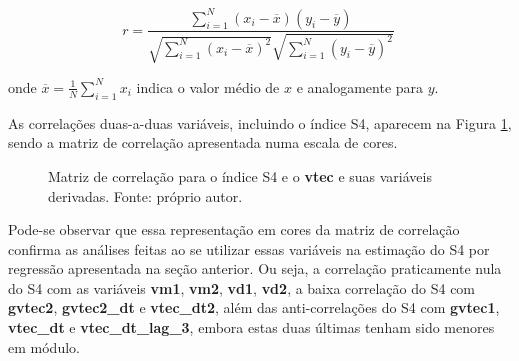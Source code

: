 \begin{equation}
 r = \frac{\sum_{i=1}^{N}(x_i-\overline{x})(y_i-\overline{y})}{\sqrt{\sum_{i=1}^{N}(x_i-\overline{x})^2}\sqrt{\sum_{i=1}^{N}(y_i-\overline{y})^2}}~
 \end{equation}
 
onde $\overline{x}=\frac{1}{N}\sum_{i=1}^Nx_i$ indica o valor médio de $x$ e analogamente para $y$.

As correlações duas-a-duas variáveis, incluindo o índice S4, aparecem na Figura \ref{fig:matriz_corr}, sendo a matriz de correlação apresentada numa escala de cores.

\begin{figure}[hhh]
\centering
{}
\caption{Matriz de correlação para o índice S4 e o {\bf vtec} e suas variáveis derivadas. Fonte: próprio autor.}
\label{fig:matriz_corr}
\end{figure}

Pode-se observar que essa representação em cores da matriz de correlação confirma as análises feitas ao se utilizar essas variáveis na estimação do S4 por regressão apresentada na seção anterior. Ou seja, a correlação praticamente nula do S4 com as variáveis {\bf vm1}, {\bf vm2}, {\bf vd1}, {\bf vd2}, a baixa correlação do S4 com {\bf gvtec2}, {\bf gvtec2\_dt} e {\bf vtec\_dt2}, além das anti-correlações do S4 com {\bf gvtec1}, {\bf vtec\_dt} e {\bf vtec\_dt\_lag\_3}, embora estas duas últimas tenham sido menores em módulo.    

